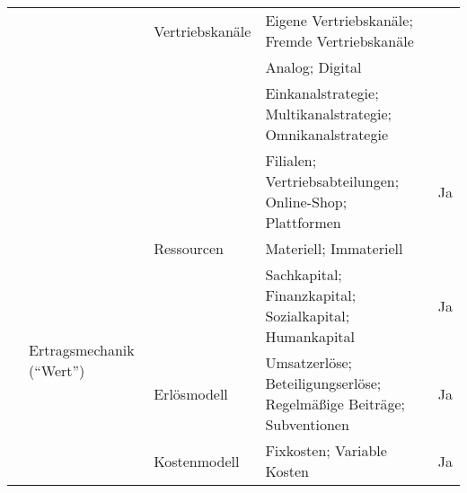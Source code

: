 \begin{sidewaystable}[htbp]
\begin{tabularx}{\textwidth}{|p{}|p{}|p{}|X|p{}|}
\cline{3-5}
 &  & Vertriebskan\"ale & Eigene Vertriebskan\"ale; Fremde Vertriebskan\"ale\\[-2pt]
 &  &  & Analog; Digital\\[-2pt]
 &  &  & Einkanalstrategie; Multikanalstrategie; Omnikanalstrategie\\[-2pt]
 &  &  & Filialen; Vertriebsabteilungen; Online-Shop; Plattformen & Ja \\
\cline{2-5}
 & \multirow{4}{*}{Ertragsmechanik (\enquote{Wert})} & Ressourcen & Materiell; Immateriell\\[-2pt]
 &  &  & Sachkapital; Finanzkapital; Sozialkapital; Humankapital & Ja \\
\cline{3-5}
 &  & Erl\"osmodell & Umsatzerl\"ose; Beteiligungserl\"ose; Regelm\"a\ss{}ige Beitr\"age; Subventionen & Ja \\
\cline{3-5}
 &  & Kostenmodell & Fixkosten; Variable Kosten & Ja \\
\hline
\end{tabularx}
\end{sidewaystable}